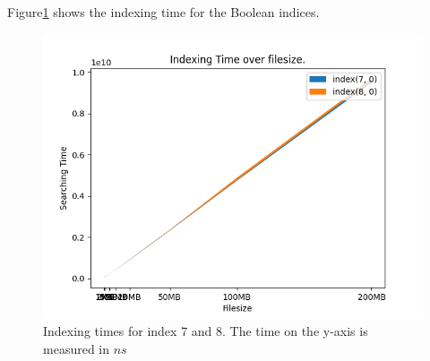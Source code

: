 Figure\ref{fig:IndexingBool} shows the indexing time for the Boolean indices.

\begin{figure}[ht!]
    \centering
    \includegraphics[width=.8\textwidth]{LaTeX/Pictures/Results/Indexing[(7, 0), (8, 0)].png}
    \caption{Indexing times for index 7 and 8. The time on the y-axis is measured in $ns$}
    \label{fig:IndexingBool}
\end{figure}